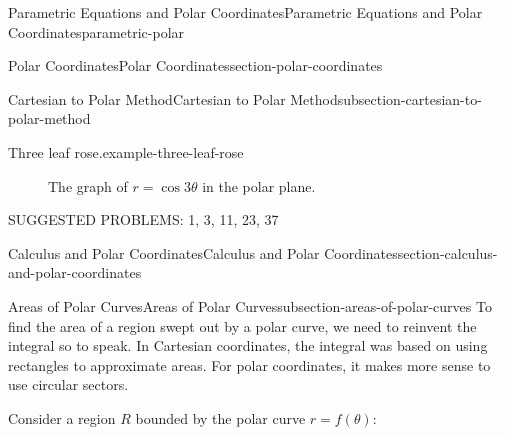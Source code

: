 \documentclass[oneside,10pt,]{book}
\numberwithin{equation}{section}
\begin{document}
\begin{chapterptx}{Parametric Equations and Polar Coordinates}{}{Parametric Equations and Polar Coordinates}{}{}{parametric-polar}
\begin{sectionptx}{Polar Coordinates}{}{Polar Coordinates}{}{}{section-polar-coordinates}
\begin{subsectionptx}{Cartesian to Polar Method}{}{Cartesian to Polar Method}{}{}{subsection-cartesian-to-polar-method}
\begin{example}{Three leaf rose.}{example-three-leaf-rose}
\begin{figure}
{
}
\caption{The graph of \(r=\cos3\theta\) in the polar plane.\label{figure-cosine-cartesian-3}}
\end{figure}
\end{example}
\hypertarget{p-1037}{}%
SUGGESTED PROBLEMS: 1, 3, 11, 23, 37%
\end{subsectionptx}
\end{sectionptx}
%
%
\typeout{************************************************}
\typeout{************************************************}
%
\begin{sectionptx}{Calculus and Polar Coordinates}{}{Calculus and Polar Coordinates}{}{}{section-calculus-and-polar-coordinates}
%
%
\typeout{************************************************}
\typeout{************************************************}
%
\begin{subsectionptx}{Areas of Polar Curves}{}{Areas of Polar Curves}{}{}{subsection-areas-of-polar-curves}
\hypertarget{p-1038}{}%
To find the area of a region swept out by a polar curve, we need to reinvent the integral so to speak. In Cartesian coordinates, the integral was based on using rectangles to approximate areas. For polar coordinates, it makes more sense to use circular sectors.%
\par
\hypertarget{p-1039}{}%
Consider a region \(R\) bounded by the polar curve \(r = f(\theta)\):%
\begin{figure}
\centering
{
\begin{tikzpicture}[scale=1.5]


\end{tikzpicture}}
\end{figure}
\end{subsectionptx}
\end{sectionptx}
\end{chapterptx}
\end{document}
